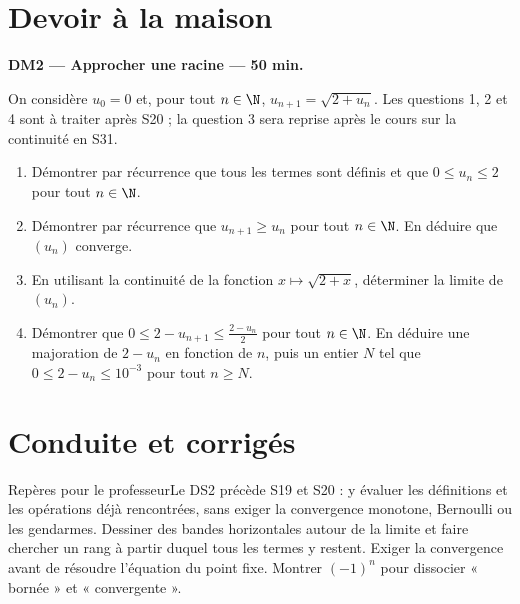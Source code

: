 \section{Devoir à la maison}\textbf{DM2 --- Approcher une racine --- 50 min.}\par On considère $u_0=0$ et, pour tout $n\in\N$, $u_{n+1}=\sqrt{2+u_n}$. Les questions 1, 2 et 4 sont à traiter après S20 ; la question 3 sera reprise après le cours sur la continuité en S31.
\begin{enumerate}\item Démontrer par récurrence que tous les termes sont définis et que $0\le u_n\le2$ pour tout $n\in\N$.
\item Démontrer par récurrence que $u_{n+1}\ge u_n$ pour tout $n\in\N$. En déduire que $(u_n)$ converge.
\item En utilisant la continuité de la fonction $x\mapsto\sqrt{2+x}$, déterminer la limite de $(u_n)$.
\item Démontrer que $0\le2-u_{n+1}\le\frac{2-u_n}{2}$ pour tout $n\in\N$. En déduire une majoration de $2-u_n$ en fonction de $n$, puis un entier $N$ tel que $0\le2-u_n\le10^{-3}$ pour tout $n\ge N$.\end{enumerate}

\ifprof\clearpage\section{Conduite et corrigés}\begin{profbox}{Repères pour le professeur}Le DS2 précède S19 et S20 : y évaluer les définitions et les opérations déjà rencontrées, sans exiger la convergence monotone, Bernoulli ou les gendarmes. Dessiner des bandes horizontales autour de la limite et faire chercher un rang à partir duquel tous les termes y restent. Exiger la convergence avant de résoudre l'équation du point fixe. Montrer $(-1)^n$ pour dissocier « bornée » et « convergente ».\end{profbox}

